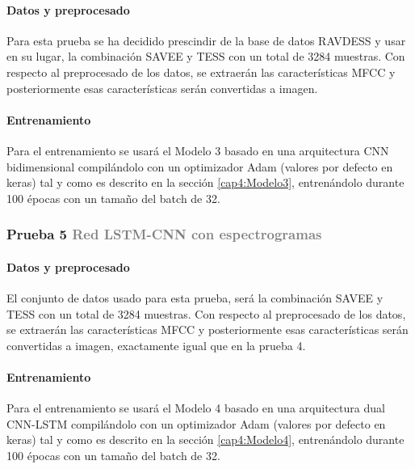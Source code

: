 \documentclass[11pt,a4paper,spanish]{book}
\begin{document}
	\setlength{\leftskip}{1cm}
		\paragraph{Datos y preprocesado} Para esta prueba se ha decidido prescindir de la base de datos RAVDESS y usar en su lugar, la combinación SAVEE y TESS con un total de 3284 muestras. Con respecto al preprocesado de los datos, se extraerán las características MFCC y posteriormente esas características serán convertidas a imagen.

		\paragraph{Entrenamiento} Para el entrenamiento se usará el Modelo 3 basado en una arquitectura CNN bidimensional compilándolo con un optimizador Adam (valores por defecto en keras) tal y como es descrito en la sección \ref{cap4:Modelo3}, entrenándolo durante 100 épocas con un tamaño del batch de 32.


	\subsubsection{\large Prueba 5 {\normalsize \textcolor{Gray}{Red LSTM-CNN con espectrogramas}}}
	
	\setlength{\leftskip}{1cm}
		\paragraph{Datos y preprocesado} El conjunto de datos usado para esta prueba, será la combinación SAVEE y TESS con un total de 3284 muestras. Con respecto al preprocesado de los datos, se extraerán las características MFCC y posteriormente esas características serán convertidas a imagen, exactamente igual que en la prueba 4.
		\paragraph{Entrenamiento} Para el entrenamiento se usará el Modelo 4 basado en una arquitectura dual CNN-LSTM compilándolo con un optimizador Adam (valores por defecto en keras) tal y como es descrito en la sección \ref{cap4:Modelo4}, entrenándolo durante 100 épocas con un tamaño del batch de 32.
	\setlength{\leftskip}{0cm}	
		
\end{document}
